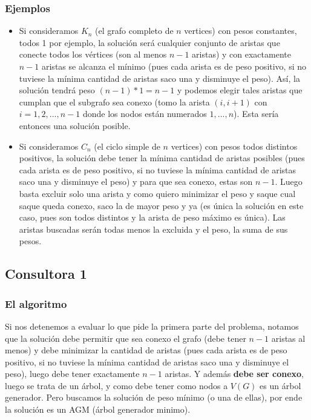 \documentclass[A4paper,oneside,fleqn,11pt]{article}
\theoremstyle{definition}
\begin{document}
\subsubsection{Ejemplos}
\begin{itemize}

\item Si consideramos $K_{n}$  (el grafo completo de $n$ vertices) con pesos constantes, todos 1 por ejemplo, la solución será cualquier conjunto de aristas que conecte todos los vértices (son al menos $n-1$ aristas) y con exactamente $n-1$ aristas se alcanza el mínimo (pues cada arista es de peso positivo, si no tuviese la mínima cantidad de aristas saco una y disminuye el peso). Así, la solución tendrá peso $(n-1)*1=n-1$ y podemos elegir tales aristas que cumplan que el subgrafo sea conexo (tomo la arista $(i,i+1)$ con $i=1,2,...,n-1$ donde los nodos están numerados $1,...,n$). Esta sería entonces una solución posible.
\item Si consideramos $C_{n}$ (el ciclo simple de $n$ vertices) con pesos todos distintos positivos, la solución debe tener la mínima cantidad de aristas posibles (pues cada arista es de peso positivo, si no tuviese la mínima cantidad de aristas saco una y disminuye el peso) y para que sea conexo, estas son $n-1$. Luego basta excluir solo una arista y como quiero minimizar el peso y saque cual saque queda conexo, saco la de mayor peso y ya (es única la solución en este caso, pues son todos distintos y la arista de peso máximo es única). Las aristas buscadas serán todas menos la excluida y el peso, la suma de sus pesos.

\end{itemize}


\subsection{Consultora 1}

\subsubsection{El algoritmo}
Si nos detenemos a evaluar lo que pide la primera parte del problema, notamos que la solución debe permitir que sea conexo el grafo (debe tener $n-1$ aristas al menos) y debe minimizar la cantidad de aristas (pues cada arista es de peso positivo, si no tuviese la mínima cantidad de aristas saco una y disminuye el peso), luego debe tener exactamente $n-1$ aristas. Y además \textbf{debe ser conexo}, luego se trata de un árbol, y como debe tener como nodos a $V(G)$ es un árbol generador. Pero buscamos la solución de peso mínimo (o una de ellas), por ende la solución es un AGM (árbol generador minimo). 
\end{document}
